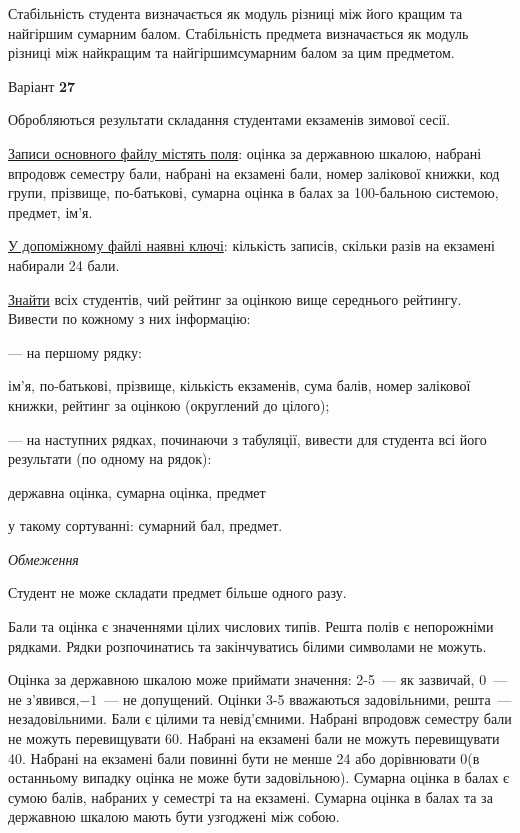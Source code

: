 \documentclass[11pt, ukrainian]{article}
\begin{document}
Стабільність студента визначається як модуль різниці між його кращим та найгіршим сумарним балом.
Стабільність предмета визначається як модуль різниці між найкращим та найгіршимсумарним балом за цим предметом.






\par
\newpage
{\center Варіант  \No \textbf { 27 }\par}
\bigskip
Обробляються результати складання студентами екзаменів зимової сесії.

\underline{Записи основного файлу містять поля}: оцінка за державною шкалою, набрані впродовж семестру бали, набрані на екзамені бали, номер залікової книжки, код групи, прізвище, по-батькові, сумарна оцінка в балах за 100-бальною системою, предмет, ім’я.

\underline{У допоміжному файлі наявні ключі}: кількість записів, скільки разів на екзамені набирали 24 бали.

\underline{Знайти} всіх студентів, чий рейтинг за оцінкою вище середнього рейтингу. Вивести по кожному з них інформацію:\par
{\noindent}--- на першому рядку:\par
ім’я, по-батькові, прізвище, кількість екзаменів, сума балів, номер залікової книжки, рейтинг за оцінкою (округлений до цілого);

{\noindent}--- на наступних рядках, починаючи з табуляції, вивести для студента всі його результати (по одному на рядок):\par
державна оцінка, сумарна оцінка, предмет

{\noindent}у такому сортуванні: сумарний бал, предмет.


\bigskip\textit{Обмеження}

Студент не може складати предмет більше одного разу.

Бали та оцінка є значеннями цілих числових типів. Решта полів є непорожніми рядками.
Рядки розпочинатись та закінчуватись білими символами не можуть.

Оцінка за державною шкалою може приймати значення: 2-5~--- як зазвичай, 0~--- не з’явився,$-1$~--- не допущений. 
Оцінки 3-5 вважаються задовільними, решта~--- незадовільними. 
Бали є цілими та невід’ємними.
Набрані впродовж семестру бали не можуть перевищувати 60. 
Набрані на екзамені бали не можуть перевищувати 40. 
Набрані на екзамені бали повинні бути не менше 24 або дорівнювати 0(в останньому випадку оцінка не може бути задовільною). 
Сумарна оцінка в балах є сумою балів, набраних у семестрі та на екзамені.
Сумарна оцінка в балах та за державною шкалою мають бути узгоджені між собою.
\end{document}
